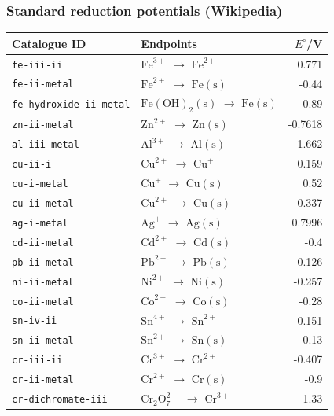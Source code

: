 \documentclass[a4paper,11pt]{ltxdoc}
\begin{document}
\subsubsection{Standard reduction potentials (Wikipedia)}
\begin{longtable}{@{}>{\raggedright\arraybackslash}p{42mm}p{87mm}r@{}}
Catalogue ID & Endpoints & $E^\circ$/V\\\hline
\endhead
\texttt{fe-iii-ii} & $\mathrm{Fe}^{3+}$ $\to$ $\mathrm{Fe}^{2+}$ & 0.771\\
\texttt{fe-ii-metal} & $\mathrm{Fe}^{2+}$ $\to$ $\mathrm{Fe}\mathrm{(s)}$ & -0.44\\
\texttt{fe-hydroxide-ii-metal} & $\mathrm{Fe}(\mathrm{O}\mathrm{H})_{2}\mathrm{(s)}$ $\to$ $\mathrm{Fe}\mathrm{(s)}$ & -0.89\\
\texttt{zn-ii-metal} & $\mathrm{Zn}^{2+}$ $\to$ $\mathrm{Zn}\mathrm{(s)}$ & -0.7618\\
\texttt{al-iii-metal} & $\mathrm{Al}^{3+}$ $\to$ $\mathrm{Al}\mathrm{(s)}$ & -1.662\\
\texttt{cu-ii-i} & $\mathrm{Cu}^{2+}$ $\to$ $\mathrm{Cu}^{+}$ & 0.159\\
\texttt{cu-i-metal} & $\mathrm{Cu}^{+}$ $\to$ $\mathrm{Cu}\mathrm{(s)}$ & 0.52\\
\texttt{cu-ii-metal} & $\mathrm{Cu}^{2+}$ $\to$ $\mathrm{Cu}\mathrm{(s)}$ & 0.337\\
\texttt{ag-i-metal} & $\mathrm{Ag}^{+}$ $\to$ $\mathrm{Ag}\mathrm{(s)}$ & 0.7996\\
\texttt{cd-ii-metal} & $\mathrm{Cd}^{2+}$ $\to$ $\mathrm{Cd}\mathrm{(s)}$ & -0.4\\
\texttt{pb-ii-metal} & $\mathrm{Pb}^{2+}$ $\to$ $\mathrm{Pb}\mathrm{(s)}$ & -0.126\\
\texttt{ni-ii-metal} & $\mathrm{Ni}^{2+}$ $\to$ $\mathrm{Ni}\mathrm{(s)}$ & -0.257\\
\texttt{co-ii-metal} & $\mathrm{Co}^{2+}$ $\to$ $\mathrm{Co}\mathrm{(s)}$ & -0.28\\
\texttt{sn-iv-ii} & $\mathrm{Sn}^{4+}$ $\to$ $\mathrm{Sn}^{2+}$ & 0.151\\
\texttt{sn-ii-metal} & $\mathrm{Sn}^{2+}$ $\to$ $\mathrm{Sn}\mathrm{(s)}$ & -0.13\\
\texttt{cr-iii-ii} & $\mathrm{Cr}^{3+}$ $\to$ $\mathrm{Cr}^{2+}$ & -0.407\\
\texttt{cr-ii-metal} & $\mathrm{Cr}^{2+}$ $\to$ $\mathrm{Cr}\mathrm{(s)}$ & -0.9\\
\texttt{cr-dichromate-iii} & $\mathrm{Cr}_{2}\mathrm{O}_{7}^{2-}$ $\to$ $\mathrm{Cr}^{3+}$ & 1.33\\

\end{longtable}
\end{document}
